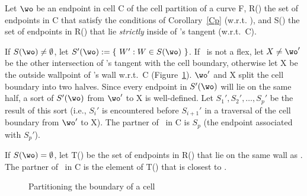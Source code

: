 \begin{theorem}
\label{Tpner}
Let $\wo$ be an endpoint in cell C of the cell partition of a curve F,
R(\wo) the set of endpoints in C that satisfy the conditions of 
Corollary~\ref{Cp} (w.r.t. \wo),
%
and S(\wo) the set of endpoints in R(\wo) that lie {\em strictly} inside of \wo's 
tangent (w.r.t.\ C).

If $S(\wo) \neq \emptyset$, let \mbox{$S'(\wo) := \{\ W':W \in S(\wo)\ \}$}.
If \wo\ is not a flex, let $X \neq \wo '$ be the other intersection of \wo's 
tangent with the cell boundary, otherwise let X be the outside wallpoint of \wo's 
wall w.r.t.\ C (Figure~\ref{3.8A}).
$\wo '$ and X split the cell boundary into two halves.
Since every endpoint in $S'(\wo)$ will lie on the same half,
a sort of $S'(\wo)$ from $\wo '$ to X is well-defined.
Let $S_{1}',S_{2}',\ldots,S_{p}'$ be the result of this sort
(i.e., $S_{i}'$ is encountered before $S_{i+1}'$ in a traversal of the cell boundary 
from $\wo '$ to X).
The partner of \wo\ in C is $S_{p}$ (the endpoint associated with $S_{p}'$).

If $S(\wo) = \emptyset$, let T(\wo) be the set of endpoints in R(\wo) that lie on 
the same wall as \wo.
The partner of \wo\ in C is the element of T(\wo) that is closest to \wo.
\end{theorem}

\begin{figure}[htb]\vspace{4.5in}\caption{Partitioning the boundary of a cell}\label{3.8A}\end{figure}

